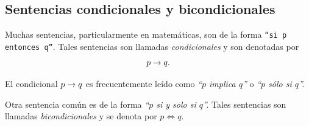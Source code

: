\subsection{Sentencias condicionales y bicondicionales}


 Muchas sentencias, particularmente en matemáticas, son de la forma \texttt{``si $p$ entonces $q$''}.  Tales sentencias son llamadas \emph{condicionales} y son denotadas por 
 $$
 p \rightarrow q.
 $$ 



 El condicional $p \rightarrow q$ es frecuentemente leído como \emph{``$p$ implica $q$''} o \emph{``$p$ sólo si $q$''.}



 Otra sentencia común es de la forma \emph{``$p$ si y solo si $q$''.}  Tales sentencias son llamadas \emph{bicondicionales} y se denota por 
 $
 p \iff q.
 $ 







